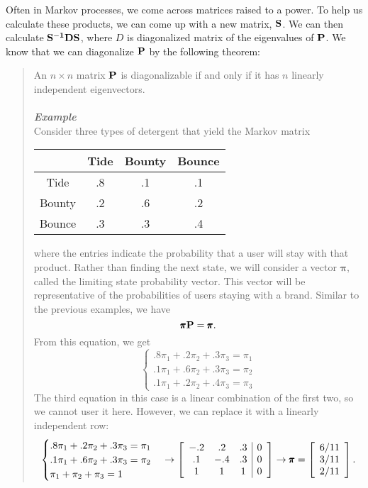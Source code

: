 \documentclass{hw}
\begin{document}
Often in Markov processes, we come across matrices raised to a power. To help us calculate these
products, we can come up with a new matrix, $\bf{S}$. We can then calculate
$\bf{S}^{-1}\bf{D}\bf{S}$, where $D$ is diagonalized matrix of the eigenvalues of $\bf{P}$. We know
that we can diagonalize $\bf{P}$ by the following theorem:
\begin{quote}
An $n\times n$ matrix $\bf{P}$ is diagonalizable if and only if it has $n$ linearly independent
eigenvectors.\\\\

\textit{\textbf{Example}}\\
Consider three types of detergent that yield the Markov matrix
\begin{center}
\begin{tabular}{c | c c c}
& Tide & Bounty & Bounce\\
\hline
Tide & .8 & .1 & .1\\
Bounty & .2 & .6 & .2\\
Bounce & .3 & .3 & .4
\end{tabular}
\end{center}
where the entries indicate the probability that a user will stay with that product. Rather than
finding the next state, we will consider a vector $\pmb{\pi}$, called the limiting state probability
vector. This vector will be representative of the probabilities of users staying with a brand.
Similar to the previous examples, we have
\[\pmb{\pi}\bf{P}=\pmb{\pi}.\]
From this equation, we get
\[
\begin{cases}
.8\pi_{1}+.2\pi_{2}+.3\pi_{3}=\pi_{1}\\
.1\pi_{1}+.6\pi_{2}+.3\pi_{3}=\pi_{2}\\
.1\pi_{1}+.2\pi_{2}+.4\pi_{3}=\pi_{3}
\end{cases}
\]
The third equation in this case is a linear combination of the first two, so we cannot user it here.
However, we can replace it with a linearly independent row:
\[
\begin{cases}
.8\pi_{1}+.2\pi_{2}+.3\pi_{3}=\pi_{1}\\
.1\pi_{1}+.6\pi_{2}+.3\pi_{3}=\pi_{2}\\
\pi_{1}+\pi_{2}+\pi_{3}=1
\end{cases}
\to
\left[
\begin{array}{c c c | c}
-.2 & .2 & .3 & 0\\
.1 & -.4 & .3 & 0\\
1 & 1 & 1 & 0
\end{array}
\right]
\to
\pmb{\pi}=
\left[
\begin{array}{c}
{6/11}\\
{3/11}\\
{2/11}
\end{array}
\right].
\]
\end{quote}
\end{document}
